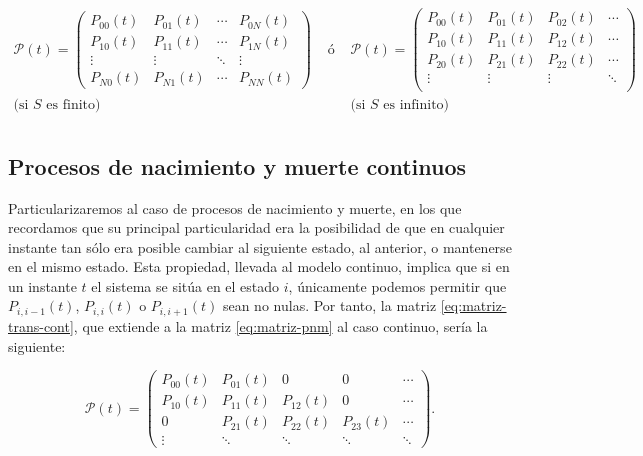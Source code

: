     \begin{equation}
        \label{eq:matriz-trans-cont}
        \begin{array}{ccc}
            \mathcal{P}(t)=\begin{pmatrix}
                P_{00}(t) & P_{01}(t) & \cdots & P_{0N}(t) \\
                P_{10}(t) & P_{11}(t) & \cdots & P_{1N}(t) \\
                \vdots & \vdots & \ddots & \vdots \\
                P_{N0}(t) & P_{N1}(t) & \cdots & P_{NN}(t)  
            \end{pmatrix} & \text{ ó } &
            \mathcal{P}(t)=\begin{pmatrix}
                P_{00}(t) & P_{01}(t) & P_{02}(t) & \cdots  \\
                P_{10}(t) & P_{11}(t) & P_{12}(t) & \cdots  \\
                P_{20}(t) & P_{21}(t) & P_{22}(t) & \cdots  \\
                \vdots & \vdots & \vdots & \ddots  \\ 
            \end{pmatrix} \\
            \text{(si }S\text{ es finito)} & & \text{(si }S\text{ es infinito)}\\
        \end{array}
    \end{equation}

    \subsection{Procesos de nacimiento y muerte continuos}

    Particularizaremos al caso de procesos de nacimiento y muerte, en los que recordamos que su principal particularidad era la posibilidad de que en cualquier instante tan sólo era posible cambiar al siguiente estado, al anterior, o mantenerse en el mismo estado. Esta propiedad, llevada al modelo continuo, implica que si en un instante $t$ el sistema se sitúa en el estado $i$, únicamente podemos permitir que $P_{i,i-1}(t)$, $P_{i,i}(t)$ o $P_{i,i+1}(t)$ sean no nulas. Por tanto, la matriz \eqref{eq:matriz-trans-cont}, que extiende a la matriz \eqref{eq:matriz-pnm} al caso continuo, sería la siguiente:

    \begin{equation}
        \label{eq:matriz-pnm-cont}
        \mathcal{P}(t) = \begin{pmatrix}
            P_{00}(t) & P_{01}(t) & 0 & 0  & \cdots \\
            P_{10}(t) & P_{11}(t) & P_{12}(t) & 0  & \cdots \\

            0 & P_{21}(t) & P_{22}(t) & P_{23}(t) &  \cdots \\
            \vdots & \ddots & \ddots & \ddots & \ddots 
        \end{pmatrix}.
    \end{equation}

